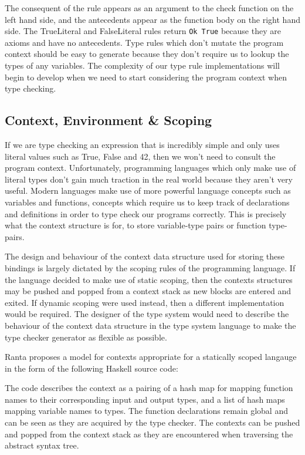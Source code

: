 \documentclass{UoYCSproject}
\begin{document}
The consequent of the rule appears as an argument to the check function on the
left hand side, and the antecedents appear as the function body on the right
hand side. The TrueLiteral and FalseLiteral rules return \lstinline{Ok True}
because they are axioms and have no antecedents. Type rules which don't mutate
the program context should be easy to generate because they don't require us
to lookup the types of any variables. The complexity of our type rule
implementations will begin to develop when we need to start considering the
program context when type checking.

\subsection{Context, Environment \& Scoping}
\label{sec:Contexts}
If we are type checking an expression that is incredibly simple and only uses
literal values such as True, False and 42, then we won't need to consult the
program context. Unfortunately, programming languages which only make use of
literal types don't gain much traction in the real world because they aren't
very useful. Modern languages make use of more powerful language concepts such
as variables and functions, concepts which require us to keep track of
declarations and definitions in order to type check our programs correctly.
This is precisely what the context structure is for, to store variable-type
pairs or function type-pairs.

The design and behaviour of the context data structure used for storing these
bindings is largely dictated by the scoping rules of the programming language.
If the language decided to make use of static scoping, then the contexts
structures may be pushed and popped from a context stack as new blocks are
entered and exited. If dynamic scoping were used instead, then a different
implementation would be required. The designer of the type system would need
to describe the behaviour of the context data structure in the type system
language to make the type checker generator as flexible as possible.

Ranta \cite{Ranta} proposes a model for contexts appropriate for a statically
scoped langauge in the form of the following Haskell source code:

The code describes the context as a pairing of a hash map for mapping function
names to their corresponding input and output types, and a list of hash maps
mapping variable names to types. The function declarations remain global and can
be seen as they are acquired by the type checker. The contexts can be pushed
and popped from the context stack as they are encountered when traversing the
abstract syntax tree.
\end{document}
